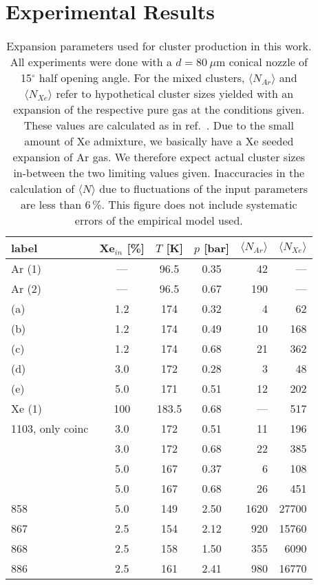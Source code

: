 \section{Experimental Results}
\begin{table}
\caption{
Expansion parameters used for cluster production in this work. All experiments were done with a $d = 80~\mu$m conical nozzle of 15$^\circ$ half opening angle. For the mixed clusters, $\langle N_{Ar} \rangle$ and $\langle N_{Xe} \rangle$ refer to hypothetical cluster sizes yielded with an expansion of the respective pure gas at the conditions given. These values are calculated as in ref.\ \protect{}. Due to the small amount of Xe admixture, we basically have a Xe seeded expansion of Ar gas. We therefore expect actual cluster sizes in-between the two limiting values given. Inaccuracies in the calculation of $\langle N\rangle$ due to fluctuations of the input parameters are less than 6\,\%. This figure does not include systematic errors of the empirical model used.
\label{tab:cluster} }

\begin{tabular}{l c c c r r}
%
\toprule
  label  &  Xe$_{in}$ [\%]  &  $T$ [K]  &  $p$ [bar] & $\langle N_{Ar} \rangle$ & $\langle N_{Xe} \rangle$ \\
%
\midrule
Ar (1)  & --- &  96.5  & 0.35  &  42  &  --- \\
Ar (2)  & --- &  96.5  & 0.67  & 190  &  --- \\
 (a) & 1.2 &  174   & 0.32  &   4  &   62 \\
 (b) & 1.2 &  174   & 0.49  &  10  &  168 \\
 (c) & 1.2 &  174   & 0.68  &  21  &  362 \\
 (d) & 3.0 &  172   & 0.28  &   3  &   48 \\
 (e) & 5.0 &  171   & 0.51  &  12  &  202 \\
Xe (1)  & 100 & 183.5  & 0.68  & ---  &  517 \\     
\midrule
1103, only coinc  & 3.0 &  172   & 0.51  &  11  &  196 \\
  & 3.0 &  172   & 0.68  &  22  &  385 \\
  & 5.0 &  167   & 0.37  &   6  &  108 \\
  & 5.0 &  167   & 0.68  &  26  &  451 \\
\midrule
858  & 5.0 &  149   & 2.50  & 1620 & 27700\\
867  & 2.5 &  154   & 2.12  &  920 & 15760\\
868  & 2.5 &  158   & 1.50  &  355 &  6090\\
886  & 2.5 &  161   & 2.41  &  980 & 16770\\
%
\bottomrule
\end{tabular}
\end{table}


